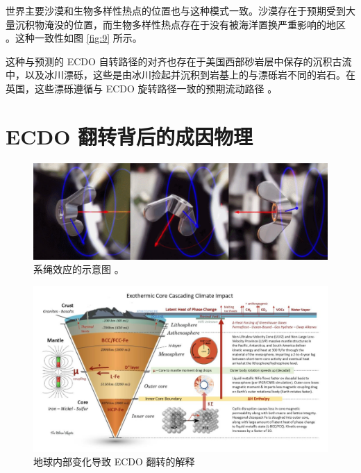 \documentclass[10pt,twocolumn,letterpaper]{article}
\begin{document}
世界主要沙漠和生物多样性热点的位置也与这种模式一致。沙漠存在于预期受到大量沉积物淹没的位置，而生物多样性热点存在于没有被海洋置换严重影响的地区 \cite{28}。这种一致性如图 \ref{fig:9} 所示。

这种与预测的 ECDO 自转路径的对齐也存在于美国西部砂岩层中保存的沉积古流中，以及冰川漂砾，这些是由冰川捡起并沉积到岩基上的与漂砾岩不同的岩石。在英国，这些漂砾遵循与 ECDO 旋转路径一致的预期流动路径 \cite{67,68}。

\section{ECDO 翻转背后的成因物理}

\begin{figure}[t]
\begin{center}
\includegraphics[width=1\textwidth]{dzhani.jpg}
\end{center}
   \caption{系绳效应的示意图 \cite{28}。}
\label{fig:10}
\end{figure}

\begin{figure}[t]
\begin{center}
\includegraphics[width=1\textwidth]{layers.jpg}
\end{center}
   \caption{地球内部变化导致 ECDO 翻转的解释 \cite{129}}
\label{fig:11}
\end{figure}
\end{document}
